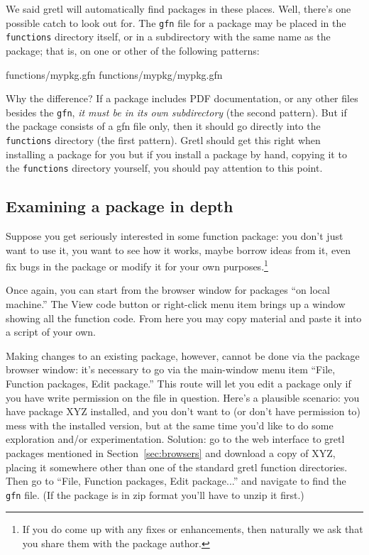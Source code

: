 \documentclass[oneside]{book}
\begin{document}
We said gretl will automatically find packages in these places. Well,
there's one possible catch to look out for. The \texttt{gfn} file for
a package may be placed in the \texttt{functions} directory itself, or
in a subdirectory with the same name as the package; that is, on one
or other of the following patterns:
%
\begin{code}
functions/mypkg.gfn
functions/mypkg/mypkg.gfn
\end{code}
%
Why the difference? If a package includes PDF documentation, or any
other files besides the \texttt{gfn}, \textit{it must be in its own
  subdirectory} (the second pattern). But if the package consists of a
gfn file only, then it should go directly into the \texttt{functions}
directory (the first pattern).  Gretl should get this right when
installing a package for you but if you install a package by hand,
copying it to the \texttt{functions} directory yourself, you should
pay attention to this point.

\subsection{Examining a package in depth}

Suppose you get seriously interested in some function package: you
don't just want to use it, you want to see how it works, maybe borrow
ideas from it, even fix bugs in the package or modify it for your own
purposes.\footnote{If you do come up with any fixes or enhancements,
  then naturally we ask that you share them with the package author.}

Once again, you can start from the browser window for packages ``on
local machine.'' The \textsf{View code} button or right-click menu
item brings up a window showing all the function code. From here
you may copy material and paste it into a script of your own.

Making changes to an existing package, however, cannot be done via the
package browser window: it's necessary to go via the main-window menu
item ``File, Function packages, Edit package.'' This route will let
you edit a package only if you have write permission on the file in
question.  Here's a plausible scenario: you have package \textsf{XYZ}
installed, and you don't want to (or don't have permission to) mess
with the installed version, but at the same time you'd like to do some
exploration and/or experimentation. Solution: go to the web interface
to gretl packages mentioned in Section~\ref{sec:browsers} and download
a copy of \textsf{XYZ}, placing it somewhere other than one of the
standard gretl function directories. Then go to ``File, Function
packages, Edit package...'' and navigate to find the \texttt{gfn}
file. (If the package is in zip format you'll have to unzip it first.)
\end{document}
